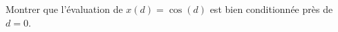 
\begin{exercice}\label{exoSerieUn0004}

 Montrer que l'évaluation de $x(d)=\cos(d)$ est bien conditionnée près de $d=0$.

\end{exercice}
